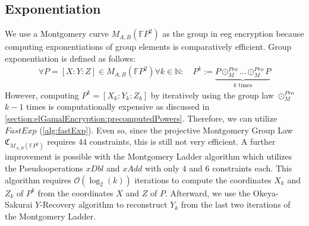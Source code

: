 % 

\subsection{Exponentiation}
We use a Montgomery curve $M_{A,B}(\mathbb{F}P^2)$ as the group in \gls{eeg} encryption because computing exponentiations of group elements is comparatively efficient.
Group exponentiation is defined as follows:
\begin{align*}
    \forall P=[X:Y:Z]\in M_{A,B}(\mathbb{F}P^2)\forall k\in\mathbb{N}:\quad P^k:=\underbrace{P\odot_{M}^{Pro}\dots\odot_{M}^{Pro}P}_{k \text{ times}}
\end{align*}
However, computing $P^k=[X_k:Y_k:Z_k]$ by iteratively using the group law $\odot_{M}^{Pro}$ $k-1$ times is computationally expensive as discussed in \cref{section:elGamalEncryption:precomputedPowers}.
Therefore, we can utilize $FastExp$ (\cref{alg:fastExp}).
Even so, since the projective Montgomery Group Law $\mathfrak{C}_{M_{A,B}(\mathbb{F}P^2)}$ requires $44$ constraints, this is still not very efficient.
A further improvement is possible with the Montgomery Ladder algorithm \cite{montgomery_speeding_1987,costello_montgomery_2018} which utilizes the Pseudooperations $xDbl$ and $xAdd$ with only $4$ and $6$ constraints each.
This algorithm requires $\mathcal{O}(\log_2(k))$ iterations to compute the coordinates $X_k$ and $Z_k$ of $P^k$ from the coordinates $X$ and $Z$ of $P$.
Afterward, we use the Okeya-Sakurai $Y$-Recovery algorithm \cite{goos_efficient_2001} to reconstruct $Y_k$ from the last two iterations of the Montgomery Ladder.

